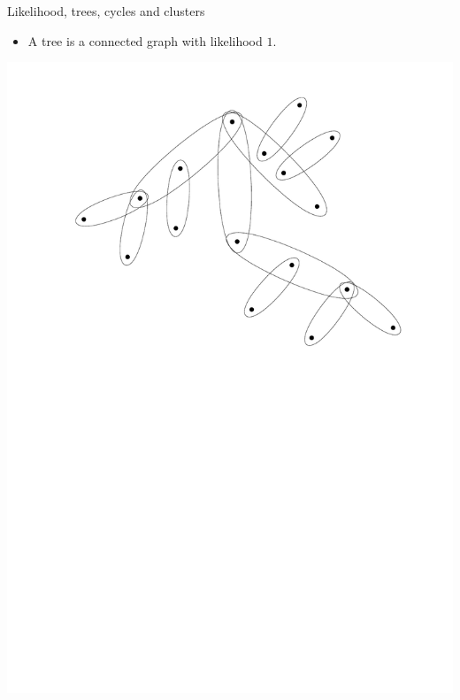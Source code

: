 \documentclass[11pt]{beamer}
\begin{document}
	\begin{frame}{Likelihood, trees, cycles and clusters} 
	\begin{itemize}
		\item A tree is a connected graph with likelihood $1$.
		\vspace*{0.5 em}
	\end{itemize}
	
	\begin{center}
		\includegraphics[width=0.7\linewidth]{Tree.pdf}
	\end{center}
	\end{frame}
	
\end{document}
